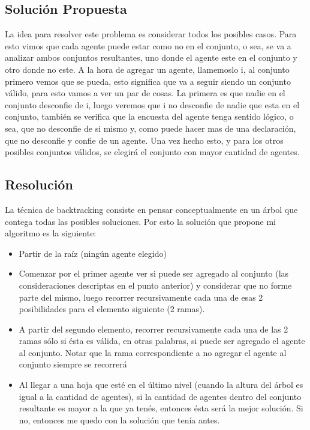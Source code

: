 \subsection{Solución Propuesta}

	La idea para resolver este problema es considerar todos los posibles casos. Para esto vimos que cada agente puede estar como no en el conjunto, o sea, se va a analizar ambos conjuntos resultantes, uno donde el agente este en el conjunto y otro donde no este. A la hora de agregar un agente, llamemoslo i, al conjunto primero vemos que se pueda, esto significa que va a seguir siendo un conjunto válido, para esto vamos a ver un par de cosas. La primera es que nadie en el conjunto desconfie de i, luego veremos que i no desconfie de nadie que esta en el conjunto, también se verifica que la encuesta del agente tenga sentido lógico, o sea, que no desconfie de si mismo y, como puede hacer mas de una declaración, que no desconfie y confie de un agente. Una vez hecho esto, y  para los otros posibles conjuntos válidos, se elegirá el conjunto con mayor cantidad de agentes. 
	
\subsection{Resolución}
	La técnica de backtracking consiste en pensar conceptualmente en un árbol que contega todas las posibles soluciones. Por esto la solución que propone mi algoritmo es la siguiente:
	
\begin{itemize}
\setlength\itemsep{-0.2em}
\item Partir de la raíz (ningún agente elegido)
\item Comenzar por el primer agente ver si puede ser agregado al conjunto (las consideraciones descriptas en el punto anterior) y considerar que no forme parte del mismo, luego recorrer recursivamente cada una de esas 2 posibilidades para el elemento siguiente (2 ramas).
\item A partir del segundo elemento, recorrer recursivamente cada una de las 2 ramas sólo si ésta es válida, en otras palabras, si puede ser agregado el agente al conjunto. Notar que la rama correspondiente a no agregar el agente al conjunto siempre se recorrerá
\item Al llegar a una hoja que esté en el último nivel (cuando la altura del árbol es igual a la cantidad de agentes), si la cantidad de agentes dentro del conjunto resultante es mayor a la que ya tenés, entonces ésta será la mejor solución. Si no, entonces me quedo con la solución que tenía antes.
\end{itemize}
	
